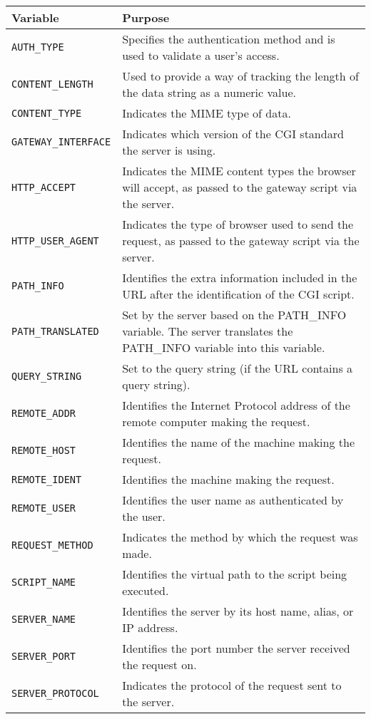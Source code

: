 \begin{center}
\begin{longtable}{|l|p{10cm}|}
\hline
{\bf Variable} & {\bf Purpose}\\
\hline
\verb|AUTH_TYPE| & 
Specifies the authentication method and is used to validate a user's access.
\\\hline
\verb|CONTENT_LENGTH| & Used to provide a way of tracking the length of the 
data string as a numeric value.\\\hline
\verb|CONTENT_TYPE| & Indicates the MIME type of data. \\\hline
\verb|GATEWAY_INTERFACE| & Indicates which version of the CGI standard the 
server is using.\\\hline
\verb|HTTP_ACCEPT|	& Indicates the MIME content types the browser will accept, 
as passed to the gateway script via the server.\\\hline
\verb|HTTP_USER_AGENT| & Indicates the type of browser used to send the request, 
as passed to the gateway script via the server.\\\hline
\verb|PATH_INFO| & Identifies the extra information included in the URL after 
the identification of the CGI script. \\\hline
\verb|PATH_TRANSLATED| & Set by the server based on the PATH\_INFO variable. 
The server translates the PATH\_INFO variable into this variable. \\\hline
\verb|QUERY_STRING| & Set to the query string (if the URL contains a query string).\\\hline 
\verb|REMOTE_ADDR| & Identifies the Internet Protocol address of the remote computer making the request.\\\hline 
\verb|REMOTE_HOST| & Identifies the name of the machine making the request.\\\hline 
\verb|REMOTE_IDENT| & Identifies the machine making the request.\\\hline 
\verb|REMOTE_USER| & Identifies the user name as authenticated by the user.\\\hline 
\verb|REQUEST_METHOD| & Indicates the method by which the request was made. \\\hline 
\verb|SCRIPT_NAME| & Identifies the virtual path to the script being executed.\\\hline 
\verb|SERVER_NAME| & Identifies the server by its host name, alias, or IP address.\\\hline 
\verb|SERVER_PORT| & Identifies the port number the server received the request on.\\\hline
\verb|SERVER_PROTOCOL| & Indicates the protocol of the request sent to the server.\\\hline
\end{longtable}
\end{center}
